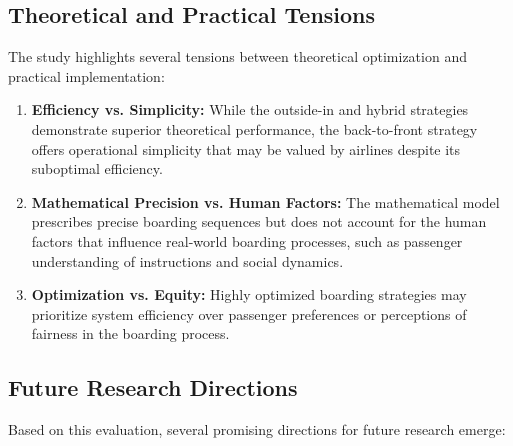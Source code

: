 \subsection{Theoretical and Practical Tensions}

The study highlights several tensions between theoretical optimization and practical implementation:

\begin{enumerate}
    \item \textbf{Efficiency vs. Simplicity:} While the outside-in and hybrid strategies demonstrate superior theoretical performance, the back-to-front strategy offers operational simplicity that may be valued by airlines despite its suboptimal efficiency.
    
    \item \textbf{Mathematical Precision vs. Human Factors:} The mathematical model prescribes precise boarding sequences but does not account for the human factors that influence real-world boarding processes, such as passenger understanding of instructions and social dynamics.
    
    \item \textbf{Optimization vs. Equity:} Highly optimized boarding strategies may prioritize system efficiency over passenger preferences or perceptions of fairness in the boarding process.
\end{enumerate}

\subsection{Future Research Directions}

Based on this evaluation, several promising directions for future research emerge:

